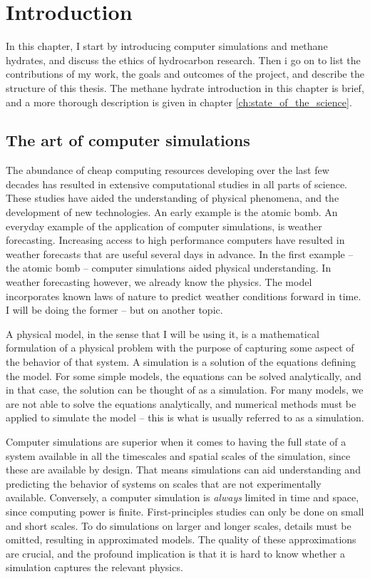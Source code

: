 \chapter{Introduction}
In this chapter, I start by introducing computer simulations and methane hydrates, and discuss the ethics of hydrocarbon research. Then i go on to list the contributions of my work, the goals and outcomes of the project, and describe the structure of this thesis. The methane hydrate introduction in this chapter is brief, and a more thorough description is given in chapter \ref{ch:state_of_the_science}.

\section{The art of computer simulations}
The abundance of cheap computing resources developing over the last few decades has resulted in extensive computational studies in all parts of science. These studies have aided the understanding of physical phenomena, and the development of new technologies. An early example is the atomic bomb. An everyday example of the application of computer simulations, is weather forecasting. Increasing access to high performance computers have resulted in weather forecasts that are useful several days in advance. In the first example -- the atomic bomb -- computer simulations aided physical understanding. In weather forecasting however, we already know the physics. The model incorporates known laws of nature to predict weather conditions forward in time. I will be doing the former -- but on another topic.

A physical model, in the sense that I will be using it, is a mathematical formulation of a physical problem with the purpose of capturing some aspect of the behavior of that system. A simulation is a solution of the equations defining the model. For some simple models, the equations can be solved analytically, and in that case, the solution can be thought of as a simulation. For many models, we are not able to solve the equations analytically, and numerical methods must be applied to simulate the model -- this is what is usually referred to as a simulation.

Computer simulations are superior when it comes to having the full state of a system available in all the timescales and spatial scales of the simulation, since these are available by design. That means simulations can aid understanding and predicting the behavior of systems on scales that are not experimentally available. Conversely, a computer simulation is \emph{always} limited in time and space, since computing power is finite. First-principles studies can only be done on small and short scales. To do simulations on larger and longer scales, details must be omitted, resulting in approximated models. The quality of these approximations are crucial, and the profound implication is that it is hard to know whether a simulation captures the relevant physics. 

